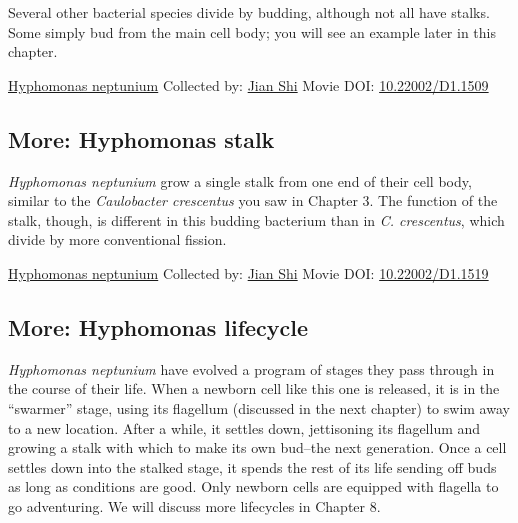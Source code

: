 \documentclass[]{tufte-book}
\begin{document}
Several other bacterial species divide by budding, although not all have stalks. Some simply bud from the main cell body; you will see an example later in this chapter.



\hypertarget{htmlwidget-ebd12ca45164a08ae9a5}{}

\label{fig:5-3}\protect\hyperlink{tree}{Hyphomonas neptunium} Collected by: \protect\hyperlink{jian_shi}{Jian Shi} Movie DOI: \href{https://doi.org/10.22002/D1.1509}{10.22002/D1.1509}

\hypertarget{Hyphomonas_stalk}{%
\subsection*{More: Hyphomonas stalk}\label{Hyphomonas_stalk}}

\emph{Hyphomonas neptunium} grow a single stalk from one end of their cell body, similar to the \emph{Caulobacter crescentus} you saw in Chapter 3. The function of the stalk, though, is different in this budding bacterium than in \emph{C. crescentus}, which divide by more conventional fission.



\hypertarget{htmlwidget-6e8f27777bb1e5cad33e}{}

\label{fig:5-3a}\protect\hyperlink{tree}{Hyphomonas neptunium} Collected by: \protect\hyperlink{jian_shi}{Jian Shi} Movie DOI: \href{https://doi.org/10.22002/D1.1519}{10.22002/D1.1519}

\hypertarget{Hyphomonas_lifecycle}{%
\subsection*{More: Hyphomonas lifecycle}\label{Hyphomonas_lifecycle}}

\emph{Hyphomonas neptunium} have evolved a program of stages they pass through in the course of their life. When a newborn cell like this one is released, it is in the ``swarmer'' stage, using its flagellum (discussed in the next chapter) to swim away to a new location. After a while, it settles down, jettisoning its flagellum and growing a stalk with which to make its own bud--the next generation. Once a cell settles down into the stalked stage, it spends the rest of its life sending off buds as long as conditions are good. Only newborn cells are equipped with flagella to go adventuring. We will discuss more lifecycles in Chapter 8.
\end{document}
